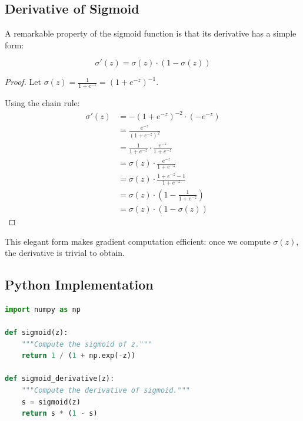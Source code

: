 \subsection{Derivative of Sigmoid}

A remarkable property of the sigmoid function is that its derivative has a simple form:

\begin{theorembox}
\[
\sigma'(z) = \sigma(z) \cdot (1 - \sigma(z))
\]
\end{theorembox}

\begin{proof}
Let $\sigma(z) = \frac{1}{1 + e^{-z}} = (1 + e^{-z})^{-1}$.

Using the chain rule:
\begin{align*}
\sigma'(z) &= -(1 + e^{-z})^{-2} \cdot (-e^{-z}) \\
&= \frac{e^{-z}}{(1 + e^{-z})^2} \\
&= \frac{1}{1 + e^{-z}} \cdot \frac{e^{-z}}{1 + e^{-z}} \\
&= \sigma(z) \cdot \frac{e^{-z}}{1 + e^{-z}} \\
&= \sigma(z) \cdot \frac{1 + e^{-z} - 1}{1 + e^{-z}} \\
&= \sigma(z) \cdot \left(1 - \frac{1}{1 + e^{-z}}\right) \\
&= \sigma(z) \cdot (1 - \sigma(z))
\end{align*}
\end{proof}

This elegant form makes gradient computation efficient: once we compute $\sigma(z)$, the derivative is trivial to obtain.

\subsection{Python Implementation}

\begin{lstlisting}[language=Python, caption=Sigmoid Function Implementation]
import numpy as np

def sigmoid(z):
    """Compute the sigmoid of z."""
    return 1 / (1 + np.exp(-z))

def sigmoid_derivative(z):
    """Compute the derivative of sigmoid."""
    s = sigmoid(z)
    return s * (1 - s)
\end{lstlisting}


